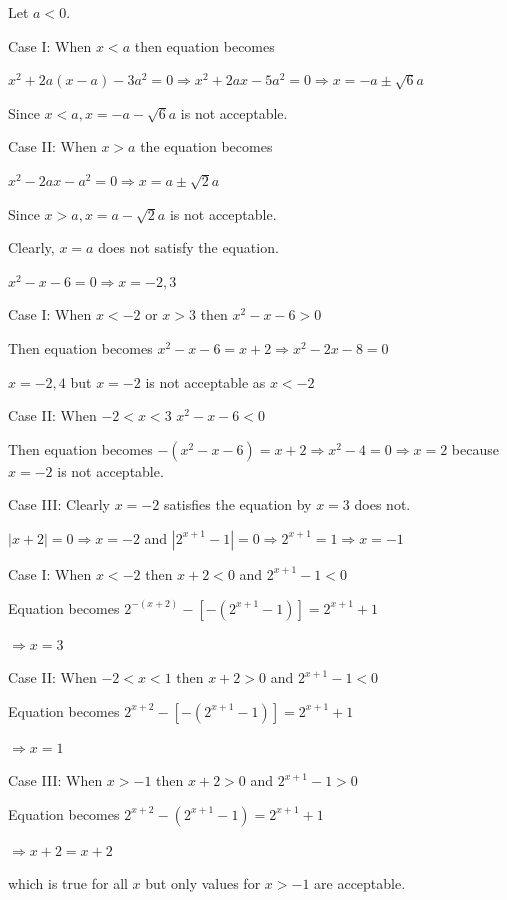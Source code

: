   Let $a < 0$.

  Case I: When $x < a$ then equation becomes

  $x^2 + 2a(x - a) - 3a^2 = 0 \Rightarrow x^2 + 2ax - 5a^2 = 0 \Rightarrow x = -a \pm \sqrt{6}a$

  Since $x < a, x = -a - \sqrt{6}a$  is not acceptable.

  Case II: When $x > a$ the equation becomes

  $x^2 - 2ax - a^2 = 0 \Rightarrow x = a \pm \sqrt{2}a$

  Since $x > a, x = a - \sqrt{2}a$ is not acceptable.

  Clearly, $x = a$ does not satisfy the equation.
\item $x^2 - x - 6 = 0 \Rightarrow x = -2, 3$

  Case I: When $x < -2$ or $x > 3$ then $x^2 - x - 6 > 0$

  Then equation becomes $x^2 - x - 6 = x + 2 \Rightarrow x^2 - 2x - 8 = 0$

  $x = -2, 4$ but $x = -2$ is not acceptable as $x < -2$

  Case II: When $-2 < x < 3$ $x^2 - x - 6 < 0$

  Then equation becomes $-(x^2 - x - 6) = x + 2 \Rightarrow x^2 - 4 = 0 \Rightarrow x = 2$ because $x =
  -2$ is not acceptable.

  Case III: Clearly $x = -2$ satisfies the equation by $x = 3$ does not.
\item $|x + 2| = 0 \Rightarrow x = -2$ and $|2^{x + 1} - 1| = 0 \Rightarrow 2^{x + 1} = 1 \Rightarrow x = -1$

  Case I: When $x < -2$ then $x + 2 < 0$ and $2^{x + 1} - 1 < 0$

  Equation becomes $2^{-(x + 2)} - [-(2^{x + 1} - 1)] = 2^{x + 1} + 1$

  $\Rightarrow x = 3$

  Case II: When $-2 < x < 1$ then $x + 2 > 0$ and $2^{x + 1} - 1 < 0$

  Equation becomes $2^{x + 2} - [-(2^{x + 1} - 1)] = 2^{x + 1} + 1$

  $\Rightarrow x = 1$

  Case III: When $x > -1$ then $x + 2 > 0$ and $2^{x + 1} - 1 > 0$

  Equation becomes $2^{x + 2} - (2^{x + 1} - 1) = 2^{x + 1} + 1$

  $\Rightarrow x + 2 = x + 2$

  which is true for all $x$ but only values for $x > -1$ are acceptable.

